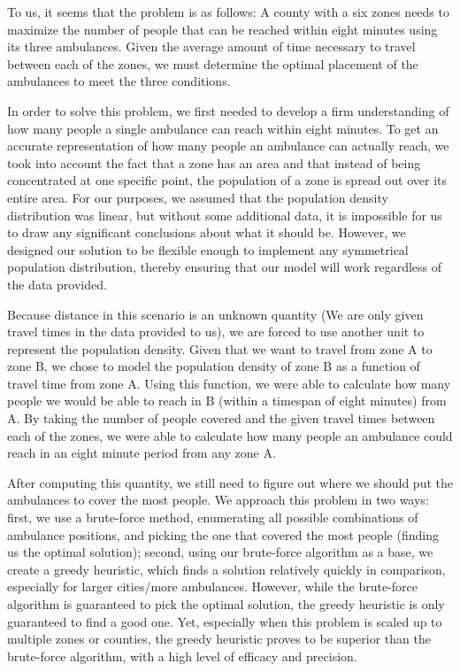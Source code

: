 \documentclass[notitlepage, 12pt]{article}
\begin{document}
To us, it seems that the problem is as follows:  A county with a six zones needs to maximize the
number of people that can be reached within eight minutes using its three ambulances. Given the
average amount of time necessary to travel between each of the zones, we must determine the optimal
placement of the ambulances to meet the three conditions.

In order to solve this problem, we first needed to develop a firm understanding of how many people
a single ambulance can reach within eight minutes. To get an accurate representation of how many
people an ambulance can actually reach, we took into account the fact that a zone has an area and
that instead of being concentrated at one specific point, the population of a zone is spread out
over its entire area. For our purposes, we assumed that the population density distribution was linear,
but without some additional data, it is impossible for us to draw any significant conclusions about
what it should be. However, we designed our solution to be flexible enough to implement any
symmetrical population distribution, thereby ensuring that our model will work regardless of the data provided.

Because distance in this scenario is an unknown quantity (We are only given travel times in the data
provided to us), we are forced to use another unit to represent the population density. Given that we
want to travel from zone A to zone B, we chose to model the population density of zone B as a function
of travel time from zone A. Using this function, we were able to calculate how many people we would be
able to reach in B (within a timespan of eight minutes) from A. By taking the number of people covered
and the given travel times between each of the zones, we were able to calculate how many people an
ambulance could reach in an eight minute period from any zone A.

After computing this quantity, we still need to figure out where we should put the ambulances to cover
the most people. We approach this problem in two ways: first, we use a brute-force method, enumerating
all possible combinations of ambulance positions, and picking the one that covered the most people
(finding us the optimal solution); second, using our brute-force algorithm as a base, we create a greedy
heuristic, which finds a solution relatively quickly in comparison, especially for larger cities/more
ambulances. However, while the brute-force algorithm is guaranteed to pick the optimal solution, the greedy
heuristic is only guaranteed to find a good one. Yet, especially when this problem is scaled up to multiple
zones or counties, the greedy heuristic proves to be superior than the brute-force algorithm, with a high
level of efficacy and precision.
\end{document}
